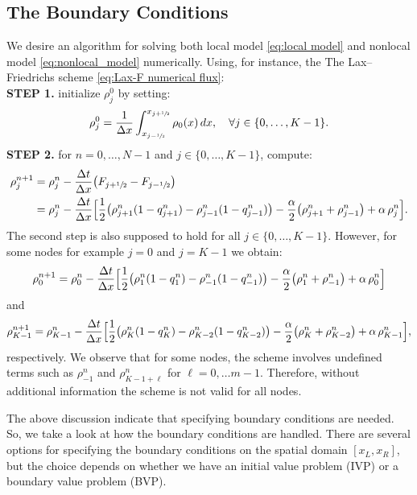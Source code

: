 \subsection{The Boundary Conditions}
We desire an algorithm for solving both local model \eqref{eq:local model} and nonlocal model \eqref{eq:nonlocal_model} numerically. Using, for instance, the The Lax--Friedrichs scheme \eqref{eq:Lax-F numerical flux}:\\[0.1in]
\textbf{STEP 1.} initialize $\rho_{j}^{0}$ by setting:
\begin{align*}
    \rho_{j}^{0} = \frac{1}{\Delta x}\int_{x_{j-\sfrac{1}{2}}}^{x_{j+\sfrac{1}{2}}} \rho_{0}(x)\,dx, \quad \forall j \in \{0,\dots,K-1\}.
\end{align*}
\textbf{STEP 2.}  for $n = 0,\dots,N-1$ and $j \in \{0,\dots,K-1\}$, compute:
\begin{align*}
    \rho_{j}^{n+1} & = \rho_{j}^{n} - \frac{\Delta t}{\Delta x}\bigl(F_{j+\sfrac{1}{2}} - F_{j-\sfrac{1}{2}}\bigr)                                                                                                                                      \\
                   & =  \rho_{j}^{n} - \frac{\Delta t}{\Delta x} \Bigl[\frac{1}{2}\bigl(\rho_{j+1}^{n}(1-q_{j+1}^{n}) - \rho_{j-1}^{n}(1-q_{j-1}^{n})\bigr) - \frac{\alpha}{2}\big(\rho_{j+1}^{n} + \rho_{j-1}^{n}\big) + \alpha \, \rho_{j}^{n}\Bigr].
\end{align*}
The second step is also supposed to hold for all $j \in \{0,\dots,K-1\}$. However, for some nodes for example $j = 0$ and  $j = K-1$ we obtain:
\[
    \rho_{0}^{n+1} = \rho_{0}^{n} - \frac{\Delta t}{\Delta x} \Bigl[\frac{1}{2}\big(\rho_{1}^{n}(1-q_{1}^{n}) - \rho_{-1}^{n}(1-q_{-1}^{n})\big) - \frac{\alpha}{2}\big(\rho_{1}^{n} + \rho_{-1}^{n}\big) + \alpha \, \rho_{0}^{n}\Bigr]
\]
and
\[
    \rho_{K-1}^{n+1} = \rho_{K-1}^{n} - \frac{\Delta t}{\Delta x} \Bigl[ \frac{1}{2}\big(\rho_{K}^{n}(1-q_{K}^{n}) - \rho_{K-2}^{n}(1-q_{K-2}^{n})\big) - \frac{\alpha}{2}\big(\rho_{K}^{n} + \rho_{K-2}^{n}\big) + \alpha \, \rho_{K-1}^{n}\Bigr],
\]
respectively.
We observe that for some nodes, the scheme involves undefined terms such as $\rho_{-1}^{n}$ and $\rho_{K-1+\ell}^{n}$ for $ \ell = 0, \dots m-1$. Therefore, without additional information the scheme is not valid for all nodes.

The above discussion indicate that specifying boundary conditions are needed. So, we take a look at how the boundary conditions are handled.
There are several options for specifying the boundary conditions on the spatial domain $[x_L, x_R]$, but the choice depends on whether we have an initial value problem (IVP) or a boundary value problem (BVP).

